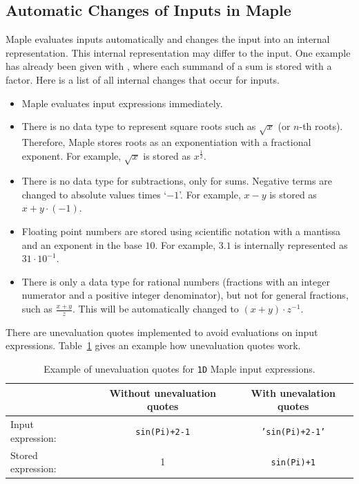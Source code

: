 \documentclass[a4paper,11pt]{article}
\newcommand{\Maple}{Maple}
\theoremstyle{defTheoStyle}
\theoremstyle{defExampStyle}
\begin{document}
	\subsection{Automatic Changes of Inputs in Maple}\label{subsec:maple-probs}
	\Maple{} evaluates inputs automatically and changes the input into an internal representation. This internal representation may differ to the input. One example has already been given with , where each summand of a sum is stored with a factor. Here is a list of all internal changes that occur for inputs.
	
	\begin{itemize}
		\item \Maple{} evaluates input expressions immediately.
		\item There is no data type to represent square roots such as $\sqrt{x}$ (or $n$-th roots). Therefore, \Maple{} stores roots as an exponentiation with a fractional exponent. For example, $\sqrt{x}$ is stored as $x^{\frac{1}{2}}$.
		\item There is no data type for subtractions, only for sums. Negative terms are changed to absolute values times `$-1$'. For example, $x-y$ is stored as $x + y \cdot (-1)$. 
		\item Floating point numbers are stored using scientific notation with a mantissa and an exponent in the base $10$. For example, $3.1$ is internally represented as $31 \cdot 10^{-1}$.
		\item There is only a data type for rational numbers (fractions with an integer numerator and a positive integer denominator), but not for general fractions, such as $\frac{x+y}{z}$. This will be automatically changed to $(x+y)\cdot z^{-1}$.
	\end{itemize}
	
	There are unevaluation quotes implemented to avoid evaluations on input expressions. Table~\ref{tab:unevaluation-quotes} gives an example how unevaluation quotes work.
	
	\begin{table}[ht]
		\centering
		\begin{tabular}{lcc}
			\hline
			& Without unevaluation quotes & With unevalation quotes\\
			\hline
			Input expression:~& \texttt{sin(Pi)+2-1} & \texttt{'sin(Pi)+2-1'}\\
			Stored expression:~& 1 & \texttt{sin(Pi)+1}\\
			\hline
		\end{tabular}
		\caption{Example of unevaluation quotes for \texttt{1D} \Maple{} input expressions.}
		\label{tab:unevaluation-quotes}
	\end{table}
	
\end{document}
